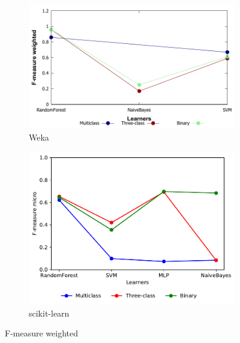 \begin{figure}[H]
    \centering
    \begin{subfigure}[t]{0.5\textwidth}
        \includegraphics[width=\linewidth]{images/weka_f1weight}
        \caption{Weka}
    \end{subfigure}%
    \begin{subfigure}[t]{0.42\textwidth}
        \includegraphics[width=\linewidth, page = 3]{images/fmeasure}
        \caption{scikit-learn}
    \end{subfigure}
    \caption{F-measure weighted}
    \label{fig:f1_weight}
\end{figure}


